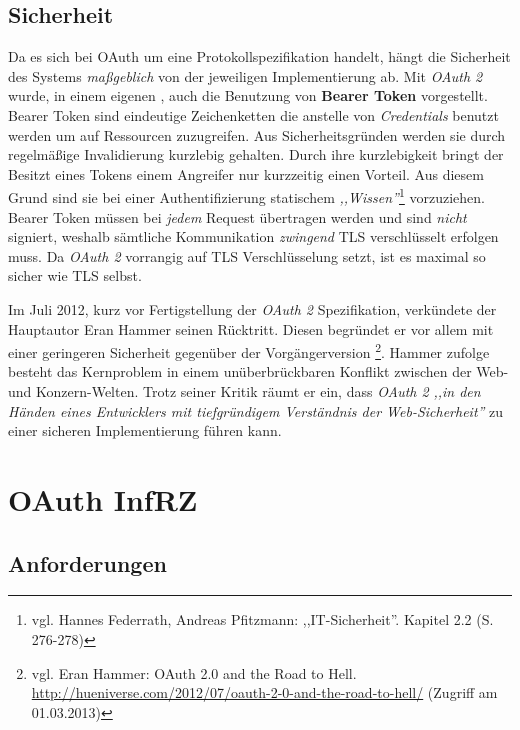 \documentclass[12pt,a4paper,pointednumbers,abstracton]{scrartcl}
\begin{document}
\subsection{Sicherheit}
\label{sec:oauth/security}

Da es sich bei OAuth um eine Protokollspezifikation handelt, hängt die Sicherheit des Systems \emph{maßgeblich} von der jeweiligen Implementierung ab.
Mit \emph{OAuth 2} wurde, in einem eigenen \cite{RFC6750}, auch die Benutzung von \textbf{Bearer Token} vorgestellt.
Bearer Token sind eindeutige Zeichenketten die anstelle von \emph{Credentials} benutzt werden um auf Ressourcen zuzugreifen.
Aus Sicherheitsgründen werden sie durch regelmäßige Invalidierung kurzlebig gehalten.
Durch ihre kurzlebigkeit bringt der Besitzt eines Tokens einem Angreifer nur kurzzeitig einen Vorteil.
Aus diesem Grund sind sie bei einer Authentifizierung statischem \emph{,,Wissen''}\footnote{vgl. \cite{WinKrö2006} Hannes Federrath, Andreas Pfitzmann: ,,IT-Sicherheit''. Kapitel 2.2 (S. 276-278)} vorzuziehen.
Bearer Token müssen bei \emph{jedem} Request übertragen werden und sind \emph{nicht} signiert, weshalb sämtliche Kommunikation \emph{zwingend} TLS verschlüsselt erfolgen muss.
Da \emph{OAuth 2} vorrangig auf TLS Verschlüsselung setzt, ist es maximal so sicher wie TLS selbst.

Im Juli 2012, kurz vor Fertigstellung der \emph{OAuth 2} Spezifikation, verkündete der Hauptautor Eran Hammer seinen Rücktritt.
Diesen begründet er vor allem mit einer geringeren Sicherheit gegenüber der Vorgängerversion \footnote{vgl. Eran Hammer: OAuth 2.0 and the Road to Hell. \url{http://hueniverse.com/2012/07/oauth-2-0-and-the-road-to-hell/} (Zugriff am 01.03.2013)}.
Hammer zufolge besteht das Kernproblem in einem unüberbrückbaren Konflikt zwischen der Web- und Konzern-Welten.
Trotz seiner Kritik räumt er ein, dass \emph{OAuth 2} \emph{,,in den Händen eines Entwicklers mit tiefgründigem Verständnis der Web-Sicherheit''} zu einer sicheren Implementierung führen kann.


\newpage
\section{OAuth InfRZ}
\label{sec:oauth-infrz}

\subsection{Anforderungen}
\label{sec:oauth-infrz/requirements}
\end{document}
